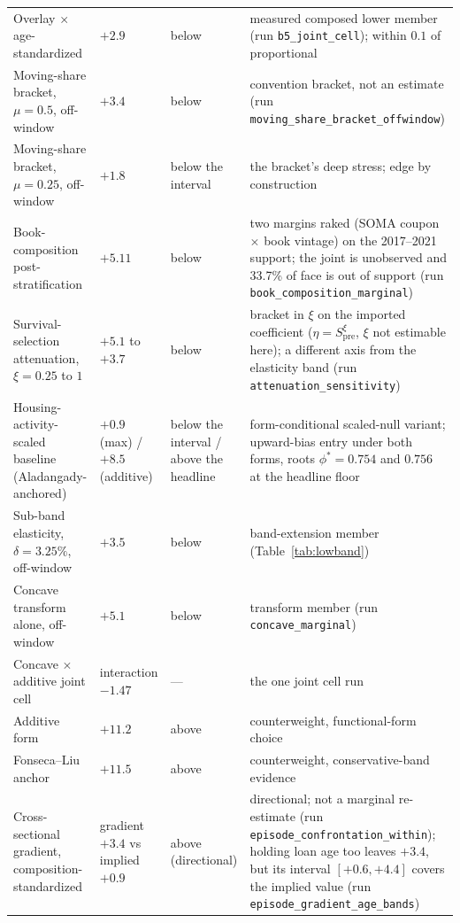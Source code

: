 \documentclass[12pt]{article}
\begin{document}
\begin{table}[!t]
\begin{tabular}{@{}p{3.1cm}p{2.6cm}p{2.4cm}p{7.7cm}@{}}
Overlay $\times$ age-standardized & $+2.9$ & below & measured composed lower member (run \texttt{b5\_joint\_cell}); within $0.1$ of proportional \\ Moving-share bracket, $\mu = 0.5$, off-window & $+3.4$ & below & convention bracket, not an estimate (run \texttt{moving\_share\_bracket\_offwindow}) \\ Moving-share bracket, $\mu = 0.25$, off-window & $+1.8$ & below the interval & the bracket's deep stress; edge by construction \\ Book-composition post-stratification & $+5.11$ & below & two margins raked (SOMA coupon $\times$ book vintage) on the 2017--2021 support; the joint is unobserved and 33.7\% of face is out of support (run \texttt{book\_composition\_marginal}) \\ Survival-selection attenuation, $\xi = 0.25$ to $1$ & $+5.1$ to $+3.7$ & below & bracket in $\xi$ on the imported coefficient ($\eta = S_{\mathrm{pre}}^{\xi}$, $\xi$ not estimable here); a different axis from the elasticity band (run \texttt{attenuation\_sensitivity}) \\ Housing-activity-scaled baseline (Aladangady-anchored) & $+0.9$ (max) / $+8.5$ (additive) & below the interval / above the headline & form-conditional scaled-null variant; upward-bias entry under both forms, roots $\phi^{*} = 0.754$ and $0.756$ at the headline floor \\ Sub-band elasticity, $\delta = 3.25\%$, off-window & $+3.5$ & below & band-extension member (Table~\ref{tab:lowband}) \\ Concave transform alone, off-window & $+5.1$ & below & transform member (run \texttt{concave\_marginal}) \\
Concave $\times$ additive joint cell & interaction $-1.47$ & --- & the one joint cell run \\
Additive form & $+11.2$ & above & counterweight, functional-form choice \\
Fonseca--Liu anchor & $+11.5$ & above & counterweight, conservative-band evidence \\ Cross-sectional gradient, composition-standardized & gradient $+3.4$ vs implied $+0.9$ & above (directional) & directional; not a marginal re-estimate (run \texttt{episode\_confrontation\_within}); holding loan age too leaves $+3.4$, but its interval $[+0.6, +4.4]$ covers the implied value (run \texttt{episode\_gradient\_age\_bands}) \\
\bottomrule
\end{tabular}
\end{table}
\end{document}
